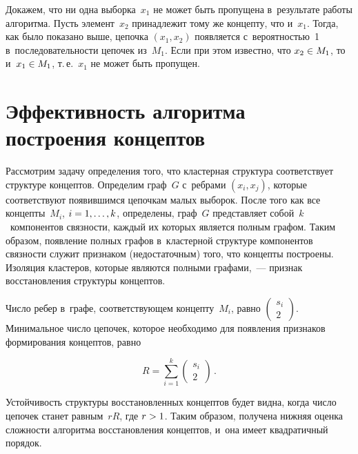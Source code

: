 \begin{multicols}{2}
  Докажем, что ни одна выборка~$x_1$ не может быть пропущена в~результате 
работы алгоритма. Пусть элемент~$x_2$ принадлежит тому же концепту, что 
и~$x_1$. Тогда, как было показано выше, цепочка $(x_1, x_2)$ появляется 
с~вероятностью~1 в~последовательности цепочек из~$M_1$. Если при этом 
известно, что $x_2\hm\in M_1$, то и~$x_1\hm\in M_1$, т.\,е.~$x_1$ не может быть 
пропущен.

\vspace*{-6pt}
  
 \section{Эффективность алгоритма построения концептов}
 
 \vspace*{-2pt}
  
  Рассмотрим задачу определения того, что клас\-тер\-ная структура соответствует 
структуре концептов. Определим граф~$G$ с~ребрами $(x_i, x_j)$, которые 
соответствуют появившимся цепочкам малых выборок. После того как все 
концепты~$M_i$, $i\hm=1,\ldots ,k$, определены, граф~$G$ представляет 
собой~$k$~компонентов связности, каждый их которых является полным графом. 
Таким образом, появление полных графов в~кластерной структуре компонентов 
связности служит признаком (недостаточным) того, что концепты построены. 
Изоляция кластеров, которые являются полными графами,~--- признак 
восстановления структуры концептов. 
  
  Число ребер в~графе, соответствующем концепту~$M_i$, равно 
$\begin{pmatrix} s_i\\ 2\end{pmatrix}$. Минимальное число цепочек, которое 
необходимо для появления признаков формирования концептов, равно 

\noindent
  $$
  R= \sum\limits_{i=1}^k \begin{pmatrix} s_i\\ 2\end{pmatrix}\,. 
  $$
  
  \vspace*{-2pt}
  
  Устойчивость структуры восстановленных концептов будет видна, когда число 
цепочек станет равным~$rR$, где $r\hm>1$. Таким образом, получена нижняя 
оценка сложности алгоритма восстановления концептов, и~она имеет 
квадратичный порядок.

\vspace*{-6pt}
  

\end{multicols}
